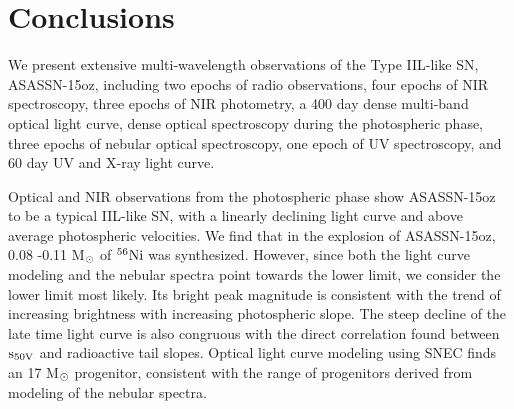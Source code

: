 \documentclass[a4paper,fleqn,usenatbib]{mnras}
\newcommand{\msun}{M$\rm{_{\odot}}$ }
\begin{document}
\section{Conclusions}\label{sec:conclude}
We present extensive multi-wavelength observations of the Type IIL-like SN, ASASSN-15oz, including two epochs of radio observations, four epochs of NIR spectroscopy, three epochs of NIR photometry, a 400 day dense multi-band optical light curve, dense optical spectroscopy during the photospheric phase, three epochs of nebular optical spectroscopy,  one epoch of UV spectroscopy, and 60 day UV and X-ray light curve.

Optical and NIR observations from the photospheric phase show ASASSN-15oz to be a typical IIL-like SN, with a linearly declining light curve and above average photospheric velocities. 
We find that in the explosion of ASASSN-15oz, 0.08 -0.11 \msun of $\rm{{}^{56}Ni}$ was synthesized. 
However, since both the light curve modeling and the nebular spectra point towards the lower limit, we consider the lower limit most likely.
Its bright peak magnitude is consistent with the trend of increasing brightness with increasing photospheric slope. 
The steep decline of the late time light curve is also congruous with the direct correlation found between $\rm{s_{50V}}$ and radioactive tail slopes.
Optical light curve modeling using SNEC finds an 17 \msun progenitor, consistent with the range of progenitors derived from modeling of the nebular spectra.
\end{document}
